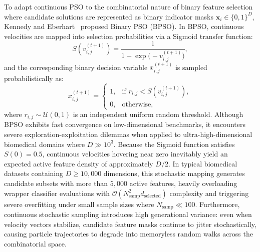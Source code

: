 To adapt continuous PSO to the combinatorial nature of binary feature selection where candidate solutions are represented as binary indicator masks $\mathbf{x}_i \in \{0, 1\}^D$, Kennedy and Eberhart~\cite{kennedy1997} proposed Binary PSO (BPSO). In BPSO, continuous velocities are mapped into selection probabilities via a Sigmoid transfer function:
\begin{equation}
S(v_{i,j}^{(t+1)}) = \frac{1}{1 + \exp\bigl(-v_{i,j}^{(t+1)}\bigr)},
\label{eq:bpsosigmoid}
\end{equation}
and the corresponding binary decision variable $x_{i,j}^{(t+1)}$ is sampled probabilistically as:
\begin{equation}
x_{i,j}^{(t+1)} = \begin{cases}
1, & \text{if } r_{i,j} < S(v_{i,j}^{(t+1)}),\\[2pt]
0, & \text{otherwise},
\end{cases}
\label{eq:bpso_sampling}
\end{equation}
where $r_{i,j} \sim \mathcal{U}(0, 1)$ is an independent uniform random threshold. Although BPSO exhibits fast convergence on low-dimensional benchmarks, it encounters severe exploration-exploitation dilemmas when applied to ultra-high-dimensional biomedical domains where $D \gg 10^3$. Because the Sigmoid function satisfies $S(0) = 0.5$, continuous velocities hovering near zero inevitably yield an expected active feature density of approximately $D/2$. In typical biomedical datasets containing $D \ge 10{,}000$ dimensions, this stochastic mapping generates candidate subsets with more than $5{,}000$ active features, heavily overloading wrapper classifier evaluations with $\mathcal{O}(N_{\mathrm{samp}}^2 d_{\mathrm{selected}})$ complexity and triggering severe overfitting under small sample sizes where $N_{\mathrm{samp}} \ll 100$. Furthermore, continuous stochastic sampling introduces high generational variance: even when velocity vectors stabilize, candidate feature masks continue to jitter stochastically, causing particle trajectories to degrade into memoryless random walks across the combinatorial space.


